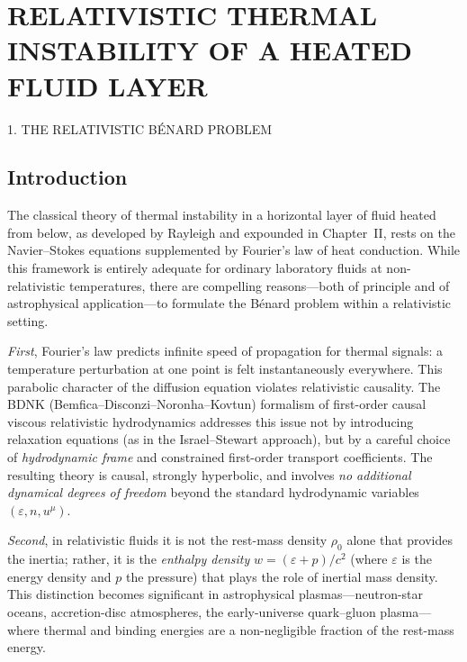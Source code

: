 
\chapter{RELATIVISTIC THERMAL INSTABILITY OF A HEATED FLUID LAYER}
\label{ch:rel2}

\begin{center}
  {\Large 1. THE RELATIVISTIC B\'ENARD PROBLEM}
\end{center}

\section{Introduction}\label{sec:rel5}

The classical theory of thermal instability in a horizontal layer of fluid
heated from below, as developed by Rayleigh and expounded in Chapter~II,
rests on the Navier--Stokes equations supplemented by Fourier's law of
heat conduction.  While this framework is entirely adequate for ordinary
laboratory fluids at non-relativistic temperatures, there are compelling
reasons---both of principle and of astrophysical application---to formulate
the B\'enard problem within a relativistic setting.

\emph{First}, Fourier's law predicts infinite speed of propagation for
thermal signals: a temperature perturbation at one point is felt
instantaneously everywhere.  This parabolic character of the
diffusion equation violates relativistic causality.  The BDNK
(Bemfica--Disconzi--Noronha--Kovtun) formalism of first-order causal
viscous relativistic hydrodynamics addresses this issue not by introducing
relaxation equations (as in the Israel--Stewart approach), but by a careful
choice of \emph{hydrodynamic frame} and constrained first-order transport
coefficients.  The resulting theory is causal, strongly hyperbolic, and
involves \emph{no additional dynamical degrees of freedom} beyond the
standard hydrodynamic variables $(\varepsilon, n, u^\mu)$.

\emph{Second}, in relativistic fluids it is not the rest-mass density
$\rho_0$ alone that provides the inertia; rather, it is the \emph{enthalpy
density} $w = (\varepsilon + p)/c^2$ (where $\varepsilon$ is the energy density
and $p$ the pressure) that plays the role of inertial mass density.
This distinction becomes significant in astrophysical plasmas---neutron-star
oceans, accretion-disc atmospheres, the early-universe quark--gluon
plasma---where thermal and binding energies are a non-negligible fraction
of the rest-mass energy.

